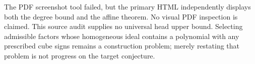 \documentclass[11pt]{article}
\begin{document}
The PDF screenshot tool failed, but the primary HTML independently
displays both the degree bound and the affine theorem. No visual PDF
inspection is claimed. This source audit supplies no universal head
upper bound. Selecting admissible factors whose homogeneous ideal
contains a polynomial with any prescribed cube signs remains a
construction problem; merely restating that problem is not progress
on the target conjecture.
\end{document}
